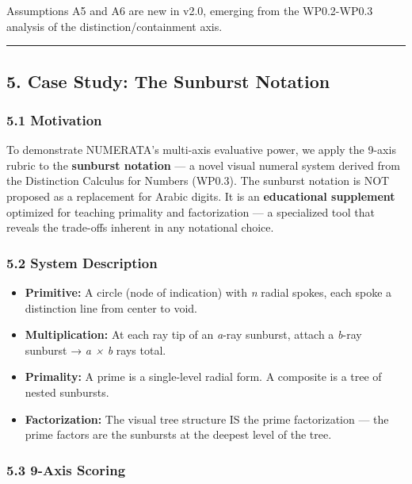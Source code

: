 \documentclass[
]{article}
\providecommand{\tightlist}{%
  \setlength{\itemsep}{0pt}\setlength{\parskip}{0pt}}
\begin{document}
Assumptions A5 and A6 are new in v2.0, emerging from the WP0.2-WP0.3
analysis of the distinction/containment axis.

\begin{center}\rule{0.5\linewidth}{0.5pt}\end{center}

\subsection{5. Case Study: The Sunburst
Notation}\label{case-study-the-sunburst-notation}

\subsubsection{5.1 Motivation}\label{motivation}

To demonstrate NUMERATA's multi-axis evaluative power, we apply the
9-axis rubric to the \textbf{sunburst notation} --- a novel visual
numeral system derived from the Distinction Calculus for Numbers
(WP0.3). The sunburst notation is NOT proposed as a replacement for
Arabic digits. It is an \textbf{educational supplement} optimized for
teaching primality and factorization --- a specialized tool that reveals
the trade-offs inherent in any notational choice.

\subsubsection{5.2 System Description}\label{system-description}

\begin{itemize}
\tightlist
\item
  \textbf{Primitive:} A circle (node of indication) with \emph{n} radial
  spokes, each spoke a distinction line from center to void.
\item
  \textbf{Multiplication:} At each ray tip of an \emph{a}-ray sunburst,
  attach a \emph{b}-ray sunburst → \emph{a × b} rays total.
\item
  \textbf{Primality:} A prime is a single-level radial form. A composite
  is a tree of nested sunbursts.
\item
  \textbf{Factorization:} The visual tree structure IS the prime
  factorization --- the prime factors are the sunbursts at the deepest
  level of the tree.
\end{itemize}

\subsubsection{5.3 9-Axis Scoring}\label{axis-scoring}
\end{document}
